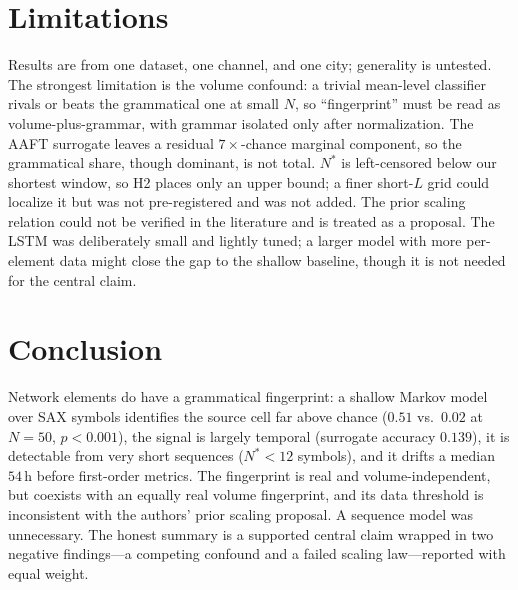 \documentclass[conference]{IEEEtran}
\begin{document}
\section{Limitations}
Results are from one dataset, one channel, and one city; generality is
untested. The strongest limitation is the volume confound: a trivial mean-level
classifier rivals or beats the grammatical one at small $N$, so ``fingerprint''
must be read as volume-plus-grammar, with grammar isolated only after
normalization. The AAFT surrogate leaves a residual $7\times$-chance marginal
component, so the grammatical share, though dominant, is not total. $N^\ast$ is
left-censored below our shortest window, so H2 places only an upper bound; a
finer short-$L$ grid could localize it but was not pre-registered and was not
added. The prior scaling relation could not be verified in the literature and
is treated as a proposal. The LSTM was deliberately small and lightly tuned;
a larger model with more per-element data might close the gap to the shallow
baseline, though it is not needed for the central claim.

\section{Conclusion}
Network elements do have a grammatical fingerprint: a shallow Markov model over
SAX symbols identifies the source cell far above chance ($0.51$ vs.\ $0.02$ at
$N{=}50$, $p<0.001$), the signal is largely temporal (surrogate accuracy
$0.139$), it is detectable from very short sequences ($N^\ast<12$ symbols), and
it drifts a median $54$\,h before first-order metrics. The fingerprint is real
and volume-independent, but coexists with an equally real volume fingerprint,
and its data threshold is inconsistent with the authors' prior scaling
proposal. A sequence model was unnecessary. The honest summary is a supported
central claim wrapped in two negative findings---a competing confound and a
failed scaling law---reported with equal weight.
\end{document}

